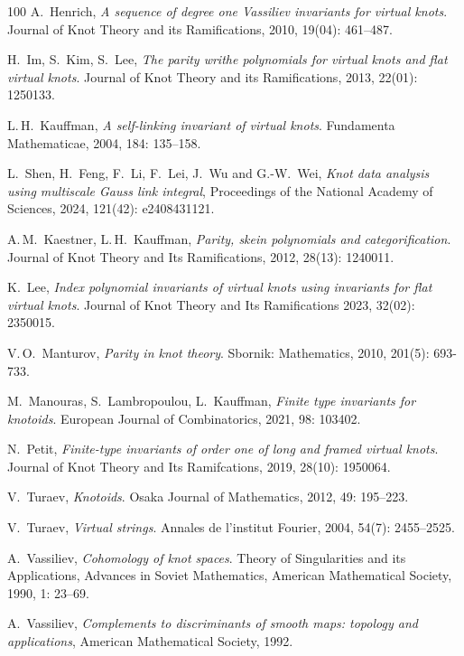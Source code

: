 \documentclass[12pt]{amsart}
\theoremstyle{noparens}
\numberwithin{equation}{section}
\numberwithin{equation}{section}
\begin{document}
\begin{thebibliography}{100}
A.~Henrich, \textit{A sequence of degree one Vassiliev invariants for virtual knots}. Journal of Knot Theory and its Ramifications, 2010, 19(04): 461--487.

H.~Im, S.~Kim, S.~Lee, \textit{The parity writhe polynomials for virtual knots and flat virtual knots}. Journal of Knot Theory and its Ramifications, 2013, 22(01): 1250133.

L.\,H.~Kauffman, \textit{A self-linking invariant of virtual knots}. Fundamenta Mathematicae, 2004, 184: 135--158.

L.~Shen, H.~Feng, F.~Li, F.~Lei, J.~Wu and G.-W.~Wei, \textit{Knot data analysis using multiscale Gauss link integral}, Proceedings of the National Academy of Sciences, 2024, 121(42): e2408431121.

A.\,M.~Kaestner, L.\,H.~Kauffman, \textit{Parity, skein polynomials and categorification}. Journal of Knot Theory and Its Ramifications, 2012, 28(13): 1240011.

K.~Lee, \textit{Index polynomial invariants of virtual knots using invariants for flat virtual knots}. Journal of Knot Theory and Its Ramifications 2023, 32(02): 2350015.

V.\,O.~Manturov, \textit{Parity in knot theory}. Sbornik: Mathematics, 2010, 201(5): 693-733.

M.~Manouras, S.~Lambropoulou, L.~Kauffman, \textit{Finite type invariants for knotoids}. European Journal of Combinatorics, 2021, 98: 103402.

N.~Petit, \textit{Finite-type invariants of order one of long and framed virtual knots}. Journal of Knot Theory and Its Ramifcations, 2019, 28(10): 1950064.

V.~Turaev, \textit{Knotoids}. Osaka Journal of Mathematics, 2012, 49: 195--223.

V.~Turaev, \textit{Virtual strings}. Annales de l'institut Fourier, 2004, 54(7): 2455--2525.

A.~Vassiliev, \textit{Cohomology of knot spaces}. Theory of Singularities and its Applications, Advances in Soviet Mathematics, American Mathematical Society, 1990, 1: 23--69.

A.~Vassiliev, \textit{Complements to discriminants of smooth maps: topology and applications}, American Mathematical Society, 1992.


\end{thebibliography}
\end{document}
